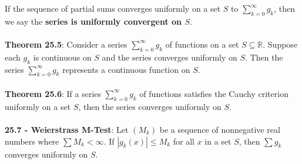 \documentclass{article}
\theoremstyle{definition}
\begin{document}
If the sequence of partial sums converges uniformly on a set $S$ to $\sum^\infty_{k = 0} g_k$, then we say the \textbf{series is uniformly convergent on $S$}. \\ \\
\textbf{Theorem 25.5}: Consider a series $\sum^\infty_{k = 0} g_k$ of functions on a set $S \subseteq \mathbb{R}$. Suppose
each $g_k$ is continuous on $S$ and the series converges uniformly on $S$. Then the series $\sum^\infty_{k = 0} g_k$ represents a continuous function on $S$. \\ \\
\textbf{Theorem 25.6}: If a series $\sum^\infty_{k = 0} g_k$ of functions satisfies the Cauchy criterion uniformly on a set $S$, then the series converges uniformly on $S$. \\ \\
\textbf{25.7 - Weierstrass M-Test}: Let $(M_k)$ be a sequence of nonnegative real numbers where $\sum M_k < \infty$. If $|g_k(x)| \leq M_k$ for all $x$ in a set $S$, then $\sum g_k$ converges
uniformly on $S$.
\end{document}

